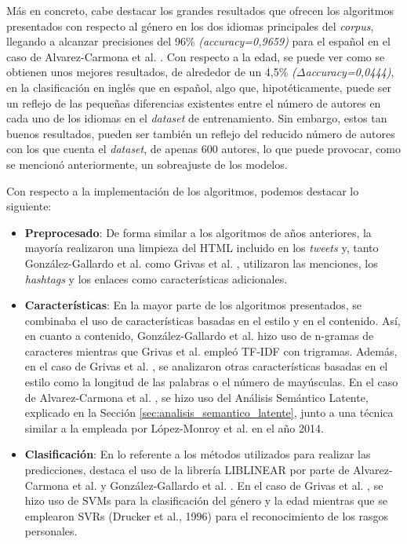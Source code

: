\bigskip
Más en concreto, cabe destacar los grandes resultados que
ofrecen los algoritmos presentados con respecto al género en los dos idiomas principales del \textit{corpus}, llegando a alcanzar
precisiones del 96\% \textit{(accuracy=0,9659)} para el español en el caso de Alvarez-Carmona et al. \cite{alvarez2015inaoe}. Con respecto a la edad,
se puede ver como se obtienen unos mejores resultados, de alrededor de un 4,5\% \textit{($\Delta$accuracy=0,0444)}, en la clasificación en inglés que en español, algo que,
hipotéticamente, puede ser un reflejo de las pequeñas diferencias existentes entre el número de autores en cada uno de los idiomas en
el \textit{dataset} de entrenamiento. Sin embargo, estos tan buenos resultados, pueden ser también un reflejo del reducido número de
autores con los que cuenta el \textit{dataset}, de apenas 600 autores, lo que puede provocar, como se mencionó anteriormente, un sobreajuste
de los modelos.

\bigskip
Con respecto a la implementación de los algoritmos, podemos destacar lo siguiente:

\begin{itemize}
	\item \textbf{Preprocesado}: De forma similar a los algoritmos de años anteriores, la mayoría realizaron una limpieza del HTML incluido
	      en los \textit{tweets} y, tanto González-Gallardo et al. \cite{gonzalez2015tweets} como Grivas et al. \cite{grivas2015author}, utilizaron
	      las menciones, los \textit{hashtags} y los enlaces como características adicionales.
	\item \textbf{Características}: En la mayor parte de los algoritmos presentados, se combinaba el uso de características
	      basadas en el estilo y en el contenido. Así, en cuanto a contenido, González-Gallardo et al. \cite{gonzalez2015tweets} hizo uso de n-gramas de caracteres
	      mientras que Grivas et al. \cite{grivas2015author} empleó TF-IDF con trigramas. Además, en el caso de Grivas et al. \cite{grivas2015author},
	      se analizaron otras características basadas en el estilo como la longitud de las palabras o el número de mayúsculas. En el caso de Alvarez-Carmona et al. \cite{alvarez2015inaoe},
	      se hizo uso del Análisis Semántico Latente, explicado en la Sección \ref{sec:analisis_semantico_latente}, junto a una técnica similar a la empleada por
	      López-Monroy et al. \cite{lopez2014using} en el año 2014.
	\item \textbf{Clasificación}: En lo referente a los métodos utilizados para realizar las predicciones, destaca el uso de la librería LIBLINEAR \cite{fan2008liblinear}
	      por parte de Alvarez-Carmona et al. \cite{alvarez2015inaoe} y González-Gallardo et al. \cite{gonzalez2015tweets}. En el caso de Grivas et al. \cite{grivas2015author}, se hizo
	      uso de SVMs para la clasificación del género y la edad mientras que se emplearon SVRs (Drucker et al., 1996) \cite{drucker1996support} para el reconocimiento de los rasgos personales.
\end{itemize}

